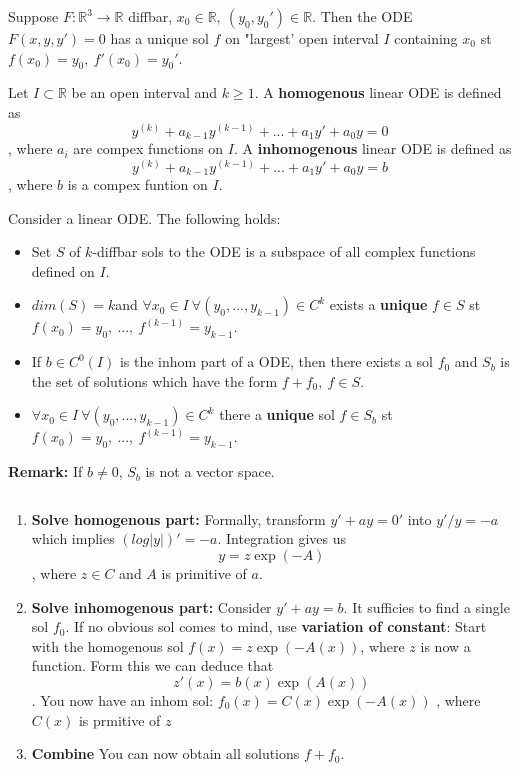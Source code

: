 \begin{theorem}
	Suppose $F: \mathbb{R}^3 \rightarrow \mathbb{R}$ diffbar, $x_0 \in \mathbb{R}, \  (y_0,y_0') \in \mathbb{R}$.
	Then the ODE $F(x,y,y') = 0$ has a unique sol $f$ on "largest' open interval $I$ containing $x_0$ st $f(x_0)= y_0, \ f'(x_0)=y_0'$.
\end{theorem}

\begin{definition}
	Let $I \subset \mathbb{R}$ be an open interval and $k \geq 1$. 
	A \textbf{homogenous} linear ODE is defined as
	$$ y^{(k)} + a_{k-1}y^{(k-1)} + ... + a_1y' + a_0y = 0 $$
	, where $a_i$ are compex functions on $I$.
	A \textbf{inhomogenous} linear ODE is defined as
	$$ y^{(k)} + a_{k-1}y^{(k-1)} + ... + a_1y' + a_0y = b$$
	, where $b$ is a compex funtion on $I$.
\end{definition}

\begin{theorem}
	Consider a linear ODE. The following holds:
	\begin{itemize}
		\item Set $S$ of $k$-diffbar sols to the ODE is a subspace of all complex functions defined on $I$.
		\item $dim(S)=k$and $\forall x_0 \in I \ \forall (y_0,...,y_{k-1}) \in C^k$ exists a \textbf{unique} $f\in S$ st $f(x_0) = y_0, \ ..., \ f^{(k-1)} = y_{k-1}$.
		\item If $b \in C^0(I)$ is the inhom part of a ODE, then there exists a sol $f_0$ and $S_b$ is the set of solutions which have the form $f + f_0, \ f \in S$.
		\item $\forall x_0 \in I \ \forall (y_0,...,y_{k-1}) \in C^k$ there a \textbf{unique} sol $f \in S_b$ st $f(x_0) = y_0, \ ..., \ f^{(k-1)} = y_{k-1}$.
	\end{itemize}
	\textbf{Remark:} If $b \neq 0$, $S_b$ is not a vector space. 
\end{theorem}

\begin{concept}
	$ $\\
	\begin{enumerate}
		\item \textbf{Solve homogenous part:}
			Formally, transform $y' + ay = 0'$ into $y'/y = -a$ which implies $(log|y|)' = -a$.
			Integration gives us
			$$ y = z\exp(-A) $$
			, where $z \in C$ and $A$ is primitive of $a$.
		\item \textbf{Solve inhomogenous part:}
			Consider $y' + ay = b$.
			It sufficies to find a single sol $f_0$.
			If no obvious sol comes to mind, use \textbf{variation of constant}:
			Start with the homogenous sol $f(x) = z\exp(-A(x))$, where $z$ is now a function.
			Form this we can deduce that
			$$z'(x) = b(x)\exp(A(x))$$.
			You now have an inhom sol: $f_0(x) = C(x)\exp(-A(x))$
			, where $C(x)$ is prmitive of $z$
		\item \textbf{Combine}
			You can now obtain all solutions $f + f_0$.
	\end{enumerate}
\end{concept}

